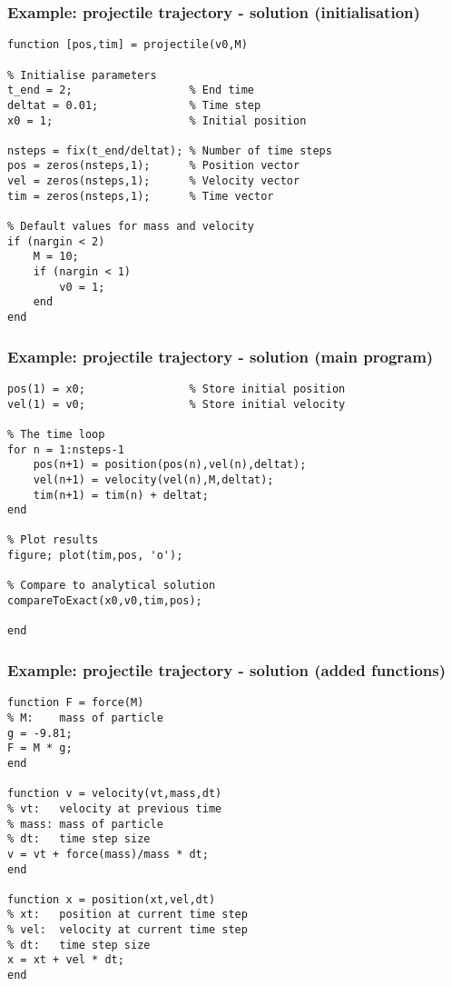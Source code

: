 \documentclass[11pt,table,final,fleqn,xcolor={usenames,dvipsnames}]{beamer}
\begin{document}
\begin{frame}[fragile]
  \frametitle{Example: projectile trajectory - solution (initialisation)}
  \scriptsize\selectfont
  \begin{lstlisting}
function [pos,tim] = projectile(v0,M)

% Initialise parameters
t_end = 2;                  % End time
deltat = 0.01;              % Time step
x0 = 1;                     % Initial position

nsteps = fix(t_end/deltat); % Number of time steps
pos = zeros(nsteps,1);      % Position vector
vel = zeros(nsteps,1);      % Velocity vector
tim = zeros(nsteps,1);      % Time vector

% Default values for mass and velocity
if (nargin < 2)
    M = 10;
    if (nargin < 1)
        v0 = 1;
    end
end
  \end{lstlisting}
\end{frame}

\begin{frame}[fragile]
  \frametitle{Example: projectile trajectory - solution (main program)}
  \scriptsize\selectfont
  \begin{lstlisting}
pos(1) = x0;                % Store initial position
vel(1) = v0;                % Store initial velocity

% The time loop
for n = 1:nsteps-1
    pos(n+1) = position(pos(n),vel(n),deltat);
    vel(n+1) = velocity(vel(n),M,deltat);
    tim(n+1) = tim(n) + deltat;
end

% Plot results
figure; plot(tim,pos, 'o');

% Compare to analytical solution
compareToExact(x0,v0,tim,pos);

end
  \end{lstlisting}
\end{frame}

\begin{frame}[fragile]
  \frametitle{Example: projectile trajectory - solution (added functions)}
  \scriptsize\selectfont
  \begin{lstlisting}
function F = force(M)
% M:    mass of particle
g = -9.81;
F = M * g;
end

function v = velocity(vt,mass,dt)
% vt:   velocity at previous time
% mass: mass of particle
% dt:   time step size
v = vt + force(mass)/mass * dt;
end

function x = position(xt,vel,dt)
% xt:   position at current time step
% vel:  velocity at current time step
% dt:   time step size
x = xt + vel * dt;
end
  \end{lstlisting}
\end{frame}
\end{document}
